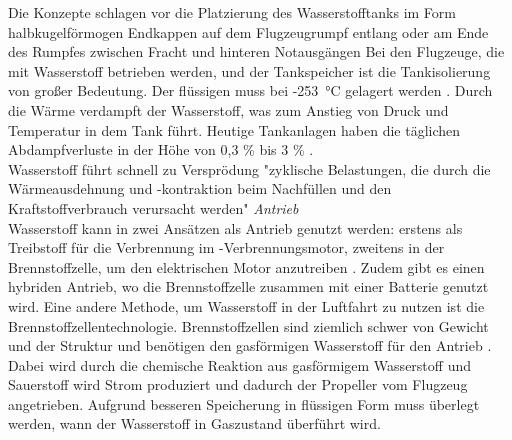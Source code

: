 Die Konzepte schlagen vor die Platzierung des Wasserstofftanks im Form halbkugelförmogen Endkappen auf dem Flugzeugrumpf entlang \cite{dahal2021techno} 
oder am Ende des Rumpfes zwischen Fracht und hinteren Notausgängen \cite{rietdijk2024architecture}
Bei den Flugzeuge, die mit Wasserstoff betrieben werden, und der Tankspeicher ist die Tankisolierung von großer Bedeutung. 
Der flüssigen  muss bei -253 °C gelagert werden \cite{colpan2022fuel}. 
Durch die Wärme verdampft der Wasserstoff, was zum Anstieg von Druck und Temperatur in dem Tank führt. Heutige Tankanlagen 
haben die täglichen Abdampfverluste in der Höhe von 0,3 \% bis 3 \% \cite{eichlseder2012hydrogen}.\\

Wasserstoff führt schnell zu Versprödung \cite{dahal2021techno}
"zyklische Belastungen, die durch die Wärmeausdehnung und -kontraktion beim Nachfüllen und den Kraftstoffverbrauch verursacht werden"
%
%
%
\textit{Antrieb}\\
Wasserstoff kann in zwei Ansätzen als Antrieb genutzt werden: 
erstens als Treibstoff für die Verbrennung im -Verbrennungsmotor,
zweitens in der Brennstoffzelle, um den elektrischen Motor anzutreiben \cite{sky2020hydrogen}. 
Zudem gibt es einen hybriden Antrieb, wo die Brennstoffzelle zusammen mit einer Batterie genutzt wird.
%
Eine andere Methode, um Wasserstoff in der Luftfahrt zu nutzen ist die Brennstoffzellentechnologie.
Brennstoffzellen sind ziemlich schwer von Gewicht und der Struktur \cite{hepperle2012electric} und 
benötigen den gasförmigen Wasserstoff für den Antrieb \cite{colpan2022fuel}.
Dabei wird durch die chemische Reaktion aus gasförmigem Wasserstoff  und Sauerstoff  wird Strom produziert \cite{dalmia2022powering} und 
dadurch der Propeller vom Flugzeug angetrieben. Aufgrund besseren Speicherung in flüssigen Form muss überlegt werden, wann der Wasserstoff in Gaszustand überführt wird. 
%
%

